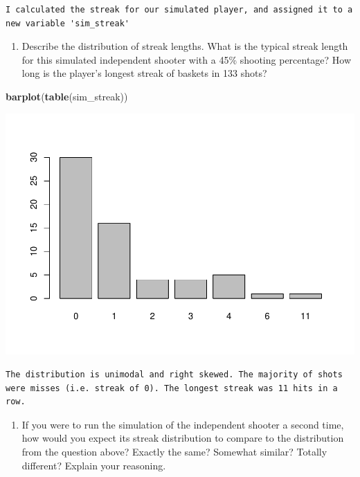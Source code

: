 \documentclass[]{article}
\newenvironment{Shaded}{\begin{snugshade}}{\end{snugshade}}
\newcommand{\KeywordTok}[1]{\textcolor[rgb]{0.13,0.29,0.53}{\textbf{{#1}}}}
\newcommand{\NormalTok}[1]{{#1}}
\providecommand{\tightlist}{%
  \setlength{\itemsep}{0pt}\setlength{\parskip}{0pt}}
\begin{document}
\begin{verbatim}
I calculated the streak for our simulated player, and assigned it to a new variable 'sim_streak'
\end{verbatim}

\begin{enumerate}
\def\labelenumi{\arabic{enumi}.}
\tightlist
\item
  Describe the distribution of streak lengths. What is the typical
  streak length for this simulated independent shooter with a 45\%
  shooting percentage? How long is the player's longest streak of
  baskets in 133 shots?
\end{enumerate}

\begin{Shaded}
\begin{Highlighting}[]
\KeywordTok{barplot}\NormalTok{(}\KeywordTok{table}\NormalTok{(sim_streak))}
\end{Highlighting}
\end{Shaded}

\includegraphics{Lab2_files/figure-latex/unnamed-chunk-4-1.pdf}

\begin{verbatim}
The distribution is unimodal and right skewed. The majority of shots were misses (i.e. streak of 0). The longest streak was 11 hits in a row.
\end{verbatim}

\begin{enumerate}
\def\labelenumi{\arabic{enumi}.}
\setcounter{enumi}{1}
\tightlist
\item
  If you were to run the simulation of the independent shooter a second
  time, how would you expect its streak distribution to compare to the
  distribution from the question above? Exactly the same? Somewhat
  similar? Totally different? Explain your reasoning.
\end{enumerate}
\end{document}
